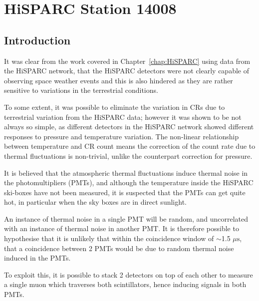 \chapter{HiSPARC Station 14008}\label{chap:HiSPARC_14008}

\section{Introduction}\label{sec:HS_14008_intro}

It was clear from the work covered in Chapter~\ref{chap:HiSPARC} using data from the HiSPARC network, that the HiSPARC detectors were not clearly capable of observing space weather events and this is also hindered as they are rather sensitive to variations in the terrestrial conditions. 

To some extent, it was possible to eliminate the variation in CRs due to terrestrial variation from the HiSPARC data; however it was shown to be not always so simple, as different detectors in the HiSPARC network showed different responses to pressure and temperature variation. The non-linear relationship between temperature and CR count means the correction of the count rate due to thermal fluctuations is non-trivial, unlike the counterpart correction for pressure. 

It is believed that the atmospheric thermal fluctuations induce thermal noise in the photomultipliers (PMTs), and although the temperature inside the HiSPARC ski-boxes have not been measured, it is suspected that the PMTs can get quite hot, in particular when the sky boxes are in direct sunlight.

An instance of thermal noise in a single PMT will be random, and uncorrelated with an instance of thermal noise in another PMT. It is therefore possible to hypothesise that it is unlikely that within the coincidence window of $\sim$1.5 $\mu \mathrm{s}$, that a coincidence between 2 PMTs would be due to random thermal noise induced in the PMTs.

To exploit this, it is possible to stack 2 detectors on top of each other to measure a single muon which traverses both scintillators, hence inducing signals in both PMTs.



